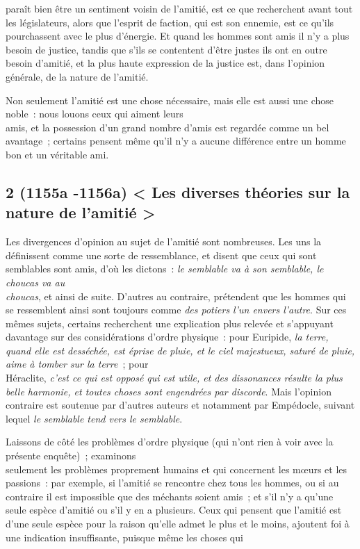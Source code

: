 \documentclass[french,twoside]{book} %
\begin{document}
paraît bien être un sentiment voisin de l’amitié, est ce que recherchent avant tout les législateurs, alors que l’esprit de faction, qui est son ennemie, est ce qu’ils pourchassent avec le plus d’énergie. Et quand les hommes sont amis il n’y a plus besoin de justice, tandis que s’ils se contentent d’être justes ils ont en outre besoin d’amitié, et la plus haute expression de la justice est, dans l’opinion générale, de la nature de l’amitié.\par
Non seulement l’amitié est une chose nécessaire, mais elle est aussi une chose noble : nous louons ceux qui aiment leurs \\
amis, et la possession d’un grand nombre d’amis est regardée comme un bel avantage ; certains pensent même qu’il n’y a aucune différence entre un homme bon et un véritable ami.
\subsection[{2 (1155a -1156a) < Les diverses théories sur la nature de l’amitié >}]{2 (1155a -1156a) < Les diverses théories sur la nature de l’amitié >}
\noindent Les divergences d’opinion au sujet de l’amitié sont nombreuses. Les uns la définissent comme une sorte de ressemblance, et disent que ceux qui sont semblables sont amis, d’où les dictons : {\itshape le semblable va à son semblable, le choucas va au} \\
{\itshape choucas}, et ainsi de suite. D’autres au contraire, prétendent que les hommes qui se ressemblent ainsi sont toujours comme  {\itshape des potiers l’un envers l’autre}. Sur ces mêmes sujets, certains recherchent une explication plus relevée et s’appuyant davantage sur des considérations d’ordre physique : pour Euripide, {\itshape la terre, quand elle est desséchée, est éprise de pluie, et le ciel majestueux, saturé de pluie, aime à tomber sur la terre} ; pour \\
Héraclite, {\itshape c’est ce qui est opposé qui est utile, et des dissonances résulte la plus belle harmonie, et toutes choses sont engendrées par discorde}. Mais l’opinion contraire est soutenue par d’autres auteurs et notamment par Empédocle, suivant lequel {\itshape le semblable tend vers le semblable}.\par
Laissons de côté les problèmes d’ordre physique (qui n’ont rien à voir avec la présente enquête) ; examinons \\
seulement les problèmes proprement humains et qui concernent les mœurs et les passions : par exemple, si l’amitié se rencontre chez tous les hommes, ou si au contraire il est impossible que des méchants soient amis ; et s’il n’y a qu’une seule espèce d’amitié ou s’il y en a plusieurs. Ceux qui pensent que l’amitié est d’une seule espèce pour la raison qu’elle admet le plus et le moins, ajoutent foi à une indication insuffisante, puisque même les choses qui \\
\end{document}
